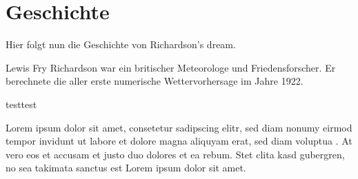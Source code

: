 %
%
%
%
\section{Geschichte
\label{geostrophisch:section:teil0}}

Hier folgt nun die Geschichte von Richardson's dream. 

Lewis Fry Richardson war ein britischer Meteorologe und Friedensforscher.
Er berechnete die aller erste numerische Wettervorhersage im Jahre 1922.

testtest

Lorem ipsum dolor sit amet, consetetur sadipscing elitr, sed diam
nonumy eirmod tempor invidunt ut labore et dolore magna aliquyam
erat, sed diam voluptua \cite{geostrophisch:bibtex}.
At vero eos et accusam et justo duo dolores et ea rebum.
Stet clita kasd gubergren, no sea takimata sanctus est Lorem ipsum
dolor sit amet.




